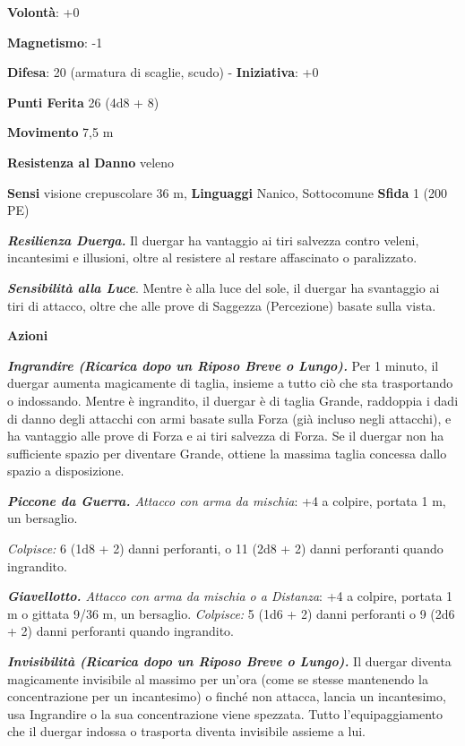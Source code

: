 \begin{multicols}{2}
\textbf{Volontà}: +0

\textbf{Magnetismo}: -1

\textbf{Difesa}: 20 (armatura di scaglie, scudo) - \textbf{Iniziativa}: +0

\textbf{Punti Ferita} 26 (4d8 + 8)

\textbf{Movimento} 7,5 m

\textbf{Resistenza al Danno} veleno

\textbf{Sensi} visione crepuscolare 36 m, 
\textbf{Linguaggi} Nanico, Sottocomune \textbf{Sfida} 1 (200 PE)\smallskip

\emph{\textbf{Resilienza Duerga.}} Il duergar ha vantaggio ai tiri
salvezza contro veleni, incantesimi e illusioni, oltre al resistere al
restare affascinato o paralizzato.

\emph{\textbf{Sensibilità alla Luce}}. Mentre è alla luce del sole, il
duergar ha svantaggio ai tiri di attacco, oltre che alle prove di
Saggezza (Percezione) basate sulla vista.

\smallskip\textbf{Azioni}

\emph{\textbf{Ingrandire (Ricarica dopo un Riposo Breve o Lungo).}} Per
1 minuto, il duergar aumenta magicamente di taglia, insieme a tutto ciò
che sta trasportando o indossando. Mentre è ingrandito, il duergar è di
taglia Grande, raddoppia i dadi di danno degli attacchi con armi basate
sulla Forza (già incluso negli attacchi), e ha vantaggio alle prove di
Forza e ai tiri salvezza di Forza. Se il duergar non ha sufficiente
spazio per diventare Grande, ottiene la massima taglia concessa dallo
spazio a disposizione.

\emph{\textbf{Piccone da Guerra.} Attacco con arma da mischia}: +4 a
colpire, portata 1 m, un bersaglio.

\emph{Colpisce:} 6 (1d8 + 2) danni perforanti, o 11 (2d8 + 2) danni
perforanti quando ingrandito.

\emph{\textbf{Giavellotto.} Attacco con arma da mischia o a Distanza}:
+4 a colpire, portata 1 m o gittata 9/36 m, un bersaglio.
\emph{Colpisce:} 5 (1d6 + 2) danni perforanti o 9 (2d6 + 2) danni
perforanti quando ingrandito.

\emph{\textbf{Invisibilità (Ricarica dopo un Riposo Breve o Lungo).}} Il
duergar diventa magicamente invisibile al massimo per un'ora (come se
stesse mantenendo la concentrazione per un incantesimo) o finché non
attacca, lancia un incantesimo, usa Ingrandire o la sua concentrazione
viene spezzata. Tutto l'equipaggiamento che il duergar indossa o
trasporta diventa invisibile assieme a lui.


\end{multicols}
